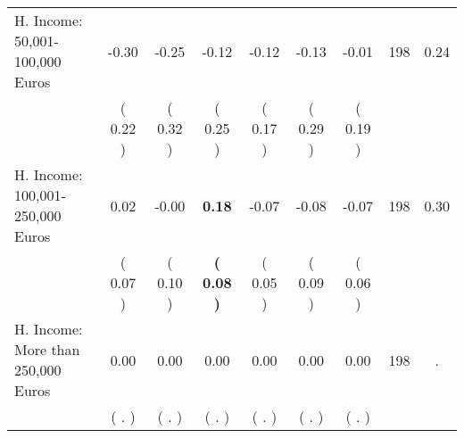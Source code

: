 \begin{tabular}{lcccccccc}
H. Income: 50,001-100,000 Euros &     -0.30 &     -0.25 &     -0.12 &     -0.12 &     -0.13 &     -0.01 & 198 &       0.24 \\ 
 & (     0.22 ) & (     0.32 ) & (     0.25 ) & (     0.17 ) & (     0.29 ) & (     0.19 ) & \\
H. Income: 100,001-250,000 Euros &      0.02 &     -0.00 & \textbf{     0.18} &     -0.07 &     -0.08 &     -0.07 & 198 &       0.30 \\ 
 & (     0.07 ) & (     0.10 ) & \textbf{(     0.08 )} & (     0.05 ) & (     0.09 ) & (     0.06 ) & \\
H. Income: More than 250,000 Euros &      0.00 &      0.00 &      0.00 &      0.00 &      0.00 &      0.00 & 198 &          . \\ 
 & (        . ) & (        . ) & (        . ) & (        . ) & (        . ) & (        . ) & \\
\bottomrule
\end{tabular}
